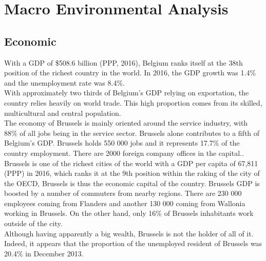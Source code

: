\documentclass[12pt,a4paper,oneside]{book}
\begin{document}
\section{Macro Environmental Analysis}

\subsection{Economic}

With a GDP of \$508.6 billion (PPP, 2016), Belgium ranks itself at the 38th position of the richest country in the world. In 2016, the GDP growth was 1.4\% and the unemployment rate was 8.4\%.\\
With approximately two thirds of Belgium's GDP relying on exportation, the country relies heavily on world trade. This high proportion comes from its skilled, multicultural and central population\cite{ciafb}.\\

The economy of Brussels is mainly oriented around the service industry, with 88\% of all jobs being in the service sector. Brussels alone contributes to a fifth of Belgium's GDP. Brussels holds 550 000 jobs and it represents 17.7\% of the country employment. There are 2000 foreign company offices in the capital.\cite{bxinfo}.\\
Brussels is one of the richest cities of the world with a GDP per capita of 67,811 (PPP) in 2016, which ranks it at the 9th position within the raking of the city of the OECD\cite{oecdstat}, Brussels is thus the economic capital of the country. Brussels GDP is boosted by a number of commuters from nearby regions. There are 230 000 employees coming from Flanders and another 130 000 coming from Wallonia working in Brussels. On the other hand, only 16\% of Brussels inhabitants work outside of the city\cite{euresCom}.\\
Although having apparently a big wealth, Brussels is not the holder of all of it. Indeed, it appears that the proportion of the unemployed resident of Brussels was 20.4\% in December 2013\cite{unemploybx}.
\end{document}
